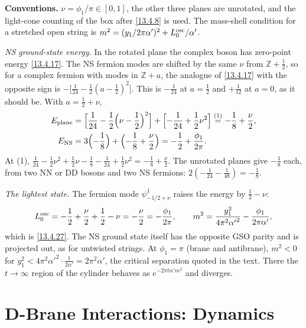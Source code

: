 \begin{tcolorbox}[breakable]
	\begin{remark}
		\textbf{Conventions.} $\nu=\phi_1/\pi\in[0,1]$, the other three planes are unrotated, and the light-cone counting of the box after \eqref{13.4.8} is used. The mass-shell condition for a stretched open string is $m^2=(y_1/2\pi\alpha')^2+L_0^{\rm osc}/\alpha'$.

		\textit{NS ground-state energy.} In the rotated plane the complex boson has zero-point energy \eqref{13.4.17}. The NS fermion modes are shifted by the same $\nu$ from $\mathbb Z+\frac12$, so for a complex fermion with modes in $\mathbb Z+a$, the analogue of \eqref{13.4.17} with the opposite sign is $-\bigl[\frac1{24}-\frac12(a-\frac12)^2\bigr]$. This is $-\frac1{24}$ at $a=\frac12$ and $+\frac1{12}$ at $a=0$, as it should be. With $a=\frac12+\nu$,
		\begin{align*}
			E_{\rm plane} &= \Bigl[\frac1{24}-\frac12\Bigl(\nu-\frac12\Bigr)^2\Bigr]+\Bigl[-\frac1{24}+\frac12\nu^2\Bigr] \overset{(1)}{=} -\frac18+\frac\nu2 ,\\
			E_{\rm NS} &= 3\Bigl(-\frac18\Bigr)+\Bigl(-\frac18+\frac\nu2\Bigr) = -\frac12+\frac{\phi_1}{2\pi} .
		\end{align*}
		At (1), $\frac1{24}-\frac12\nu^2+\frac12\nu-\frac18-\frac1{24}+\frac12\nu^2=-\frac18+\frac\nu2$. The unrotated planes give $-\frac18$ each, from two NN or DD bosons and two NS fermions: $2(-\frac1{24}-\frac1{48})=-\frac18$.

		\textit{The lightest state.} The fermion mode $\psi^1_{-1/2+\nu}$ raises the energy by $\frac12-\nu$:
		\begin{equation*}
			L_0^{\rm osc} = -\frac12+\frac\nu2+\frac12-\nu = -\frac\nu2 = -\frac{\phi_1}{2\pi},\qquad
			m^2 = \frac{y_1^2}{4\pi^2{\alpha'}^2}-\frac{\phi_1}{2\pi\alpha'} ,
		\end{equation*}
		which is \eqref{13.4.27}. The NS ground state itself has the opposite GSO parity and is projected out, as for untwisted strings. At $\phi_1=\pi$ (brane and antibrane), $m^2<0$ for $y_1^2<4\pi^2\alpha'^2\cdot\frac{1}{2\alpha'}=2\pi^2\alpha'$, the critical separation quoted in the text. There the $t\to\infty$ region of the cylinder behaves as $e^{-2\pi t\alpha'm^2}$ and diverges.
	\end{remark}
\end{tcolorbox}


\section{D-Brane Interactions: Dynamics}

